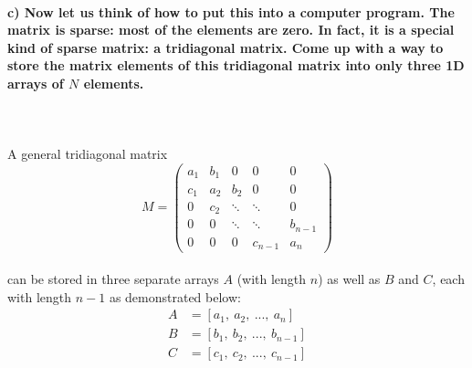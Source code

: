 \paragraph{
    c) Now let us think of how to put this into a computer program. The
    matrix is sparse: most of the elements are zero. In fact, it is a
    special kind of sparse matrix: a tridiagonal matrix. Come up with a
    way to store the matrix elements of this tridiagonal matrix into
    only three 1D arrays of $N$ elements.
} \ \\
    \\
    A general tridiagonal matrix
    \begin{equation}
        M=
        \begin{pmatrix}
            a_1 & b_1 & 0      & 0       & 0 \\
            c_1 & a_2 & b_2    & 0       & 0 \\
            0   & c_2 & \ddots & \ddots  & 0 \\
            0   & 0   & \ddots & \ddots  & b_{n-1} \\
            0   & 0   & 0      & c_{n-1} & a_n
        \end{pmatrix}
    \end{equation} \ \\
    can be stored in three separate arrays $A$ (with length $n$) as well as
    $B$ and $C$, each with length $n-1$ as demonstrated below:
    \begin{align}
        A&=[a_1,\ a_2,\ ...,\ a_n] \\
        B&=[b_1,\ b_2,\ ...,\ b_{n-1}] \\
        C&=[c_1,\ c_2,\ ...,\ c_{n-1}]
    \end{align}

\newpage
